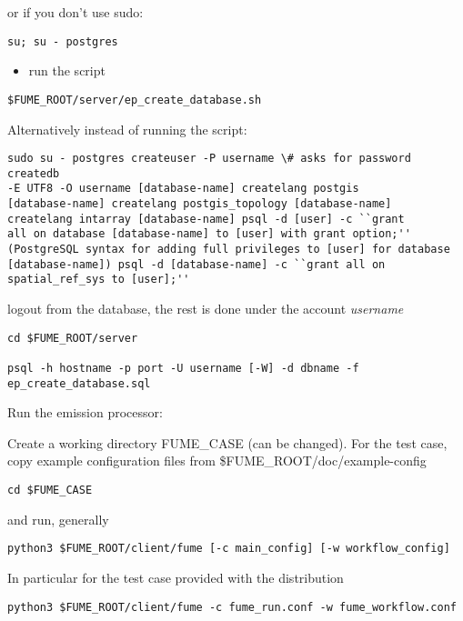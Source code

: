 \documentclass[a4paper,11pt]{article}
\begin{document}
or if you don't use sudo:

\begin{verbatim}
su; su - postgres
\end{verbatim}

\begin{itemize}
\item
  run the script
\end{itemize}

\begin{verbatim}
$FUME_ROOT/server/ep_create_database.sh
\end{verbatim}

Alternatively instead of running the script:

\begin{verbatim}
sudo su - postgres createuser -P username \# asks for password createdb
-E UTF8 -O username [database-name] createlang postgis
[database-name] createlang postgis_topology [database-name]
createlang intarray [database-name] psql -d [user] -c ``grant
all on database [database-name] to [user] with grant option;''
(PostgreSQL syntax for adding full privileges to [user] for database
[database-name]) psql -d [database-name] -c ``grant all on
spatial_ref_sys to [user];''
\end{verbatim}

logout from the database, the rest is done under the account \emph{username}

\begin{verbatim}
cd $FUME_ROOT/server

psql -h hostname -p port -U username [-W] -d dbname -f ep_create_database.sql
\end{verbatim}

Run the emission processor:

Create a working directory FUME\_CASE (can be changed). For the test
case, copy example configuration files from
\$FUME\_ROOT/doc/example-config

\begin{verbatim}
cd $FUME_CASE
\end{verbatim}

and run, generally

\begin{verbatim}
python3 $FUME_ROOT/client/fume [-c main_config] [-w workflow_config]
\end{verbatim}

In particular for the test case provided with the distribution 

\begin{verbatim}
python3 $FUME_ROOT/client/fume -c fume_run.conf -w fume_workflow.conf
\end{verbatim}
\end{document}

